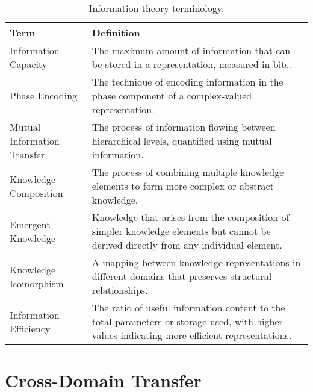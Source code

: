 \begin{table}[h]
\centering
\begin{tabular}{|l|p{12cm}|}
\hline
\textbf{Term} & \textbf{Definition} \\
\hline
Information Capacity & The maximum amount of information that can be stored in a representation, measured in bits. \\
\hline
Phase Encoding & The technique of encoding information in the phase component of a complex-valued representation. \\
\hline
Mutual Information Transfer & The process of information flowing between hierarchical levels, quantified using mutual information. \\
\hline
Knowledge Composition & The process of combining multiple knowledge elements to form more complex or abstract knowledge. \\
\hline
Emergent Knowledge & Knowledge that arises from the composition of simpler knowledge elements but cannot be derived directly from any individual element. \\
\hline
Knowledge Isomorphism & A mapping between knowledge representations in different domains that preserves structural relationships. \\
\hline
Information Efficiency & The ratio of useful information content to the total parameters or storage used, with higher values indicating more efficient representations. \\
\hline
\end{tabular}
\caption{Information theory terminology.}
\label{tab:information_terminology}
\end{table}

\section{Cross-Domain Transfer}

